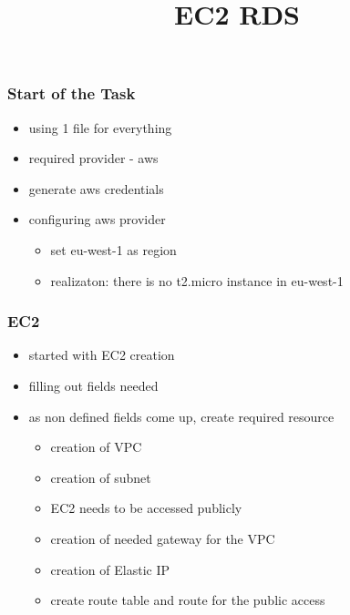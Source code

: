 \documentclass{beamer}
\title{EC2 RDS}
\begin{document}
\date{}
\frame{\titlepage}

	\begin{frame}
		\frametitle{Start of the Task}
		\begin{itemize}
		\item using 1 file for everything
		\item required provider - aws
		\item generate aws credentials
		\item configuring aws provider
			\begin{itemize}
				\item set eu-west-1 as region
				\item realizaton: there is no t2.micro instance in eu-west-1
			\end{itemize}
		\end{itemize}
	\end{frame}

	\begin{frame}
		\frametitle{EC2}	
		\begin{itemize}
			\item started with EC2 creation
			\item filling out fields needed
			\item as non defined fields come up, create required resource
			\begin{itemize}
				\item creation of VPC 
				\item creation of subnet
				\item EC2 needs to be accessed publicly
				\item creation of needed gateway for the VPC
				\item creation of Elastic IP
				\item create route table and route for the public access
			\end{itemize}
		\end{itemize}
	\end{frame}
	
\end{document}
